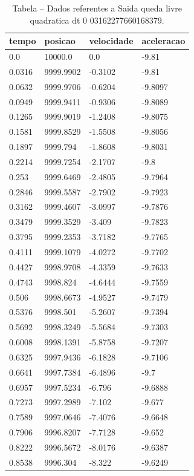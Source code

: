 \begin{table}[H]
\centering
\caption{Tabela – Dados referentes a Saida queda livre quadratica dt 0 03162277660168379.}
\label{tab:saida_queda_livre_quadratica_dt_0_03162277660168379}
\begin{tabular}{llll}
\toprule
tempo & posicao & velocidade & aceleracao \\
\midrule
0.0 & 10000.0 & 0.0 & -9.81 \\
0.0316 & 9999.9902 & -0.3102 & -9.81 \\
0.0632 & 9999.9706 & -0.6204 & -9.8097 \\
0.0949 & 9999.9411 & -0.9306 & -9.8089 \\
0.1265 & 9999.9019 & -1.2408 & -9.8075 \\
0.1581 & 9999.8529 & -1.5508 & -9.8056 \\
0.1897 & 9999.794 & -1.8608 & -9.8031 \\
0.2214 & 9999.7254 & -2.1707 & -9.8 \\
0.253 & 9999.6469 & -2.4805 & -9.7964 \\
0.2846 & 9999.5587 & -2.7902 & -9.7923 \\
0.3162 & 9999.4607 & -3.0997 & -9.7876 \\
0.3479 & 9999.3529 & -3.409 & -9.7823 \\
0.3795 & 9999.2353 & -3.7182 & -9.7765 \\
0.4111 & 9999.1079 & -4.0272 & -9.7702 \\
0.4427 & 9998.9708 & -4.3359 & -9.7633 \\
0.4743 & 9998.824 & -4.6444 & -9.7559 \\
0.506 & 9998.6673 & -4.9527 & -9.7479 \\
0.5376 & 9998.501 & -5.2607 & -9.7394 \\
0.5692 & 9998.3249 & -5.5684 & -9.7303 \\
0.6008 & 9998.1391 & -5.8758 & -9.7207 \\
0.6325 & 9997.9436 & -6.1828 & -9.7106 \\
0.6641 & 9997.7384 & -6.4896 & -9.7 \\
0.6957 & 9997.5234 & -6.796 & -9.6888 \\
0.7273 & 9997.2989 & -7.102 & -9.677 \\
0.7589 & 9997.0646 & -7.4076 & -9.6648 \\
0.7906 & 9996.8207 & -7.7128 & -9.652 \\
0.8222 & 9996.5672 & -8.0176 & -9.6387 \\
0.8538 & 9996.304 & -8.322 & -9.6249 \\

\end{tabular}
\end{table}
